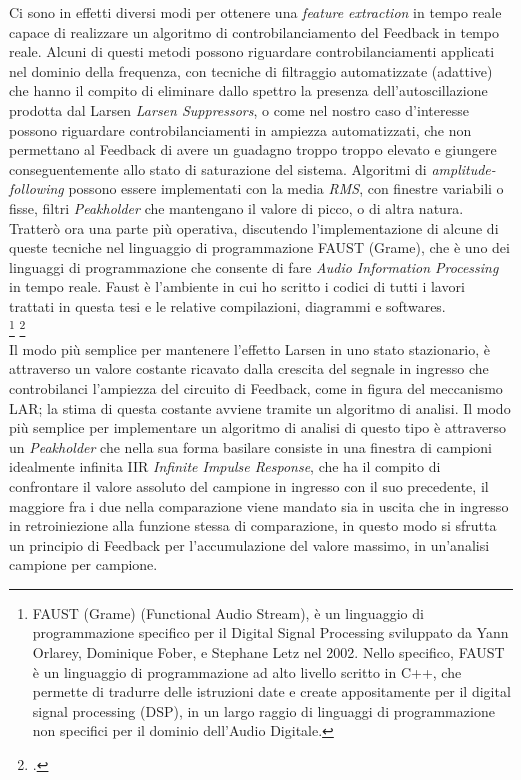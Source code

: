 Ci sono in effetti diversi modi per ottenere una \textit{feature extraction} 
in tempo reale capace di realizzare un algoritmo di controbilanciamento 
del Feedback in tempo reale.
Alcuni di questi metodi possono riguardare controbilanciamenti 
applicati nel dominio della frequenza,
con tecniche di filtraggio automatizzate (adattive) che
hanno il compito di eliminare dallo spettro la presenza dell'autoscillazione prodotta dal Larsen \textit{Larsen Suppressors},
o come nel nostro caso d’interesse possono riguardare controbilanciamenti in ampiezza
automatizzati, che non permettano al Feedback di avere un guadagno troppo troppo elevato 
e giungere conseguentemente allo stato di saturazione del sistema.
Algoritmi di \textit{amplitude-following} possono essere implementati 
con la media \textit{RMS}, con finestre variabili o fisse, 
filtri \textit{Peakholder} che mantengano il valore di picco, o di altra natura. \\
Tratterò ora  una parte più operativa, discutendo l'implementazione
di alcune di queste tecniche nel linguaggio di programmazione FAUST (Grame), 
che è uno dei linguaggi di programmazione
che consente di fare \textit{Audio Information Processing} in tempo reale.
Faust è l'ambiente in cui ho scritto i codici di tutti i lavori trattati
in questa tesi e le relative compilazioni, diagrammi e softwares. \\
\footnote{FAUST (Grame) (Functional Audio Stream), 
è un linguaggio di programmazione specifico per il Digital Signal
Processing sviluppato da Yann Orlarey, Dominique Fober, e Stephane Letz nel
2002. Nello specifico, FAUST è un linguaggio di programmazione ad alto livello
scritto in C++, che permette di tradurre delle istruzioni date e create 
appositamente per il digital signal processing (DSP), in un largo raggio di linguaggi
di programmazione non specifici per il dominio dell’Audio Digitale.} \footcite{https://faust.grame.fr/} \\
Il modo più semplice per mantenere l’effetto Larsen in uno stato stazionario, è attraverso un
valore costante ricavato dalla crescita del segnale in ingresso 
che controbilanci l’ampiezza del circuito di Feedback, come in figura del meccanismo LAR;
la stima di questa costante avviene tramite un algoritmo di analisi.
Il modo più semplice per implementare un algoritmo di analisi di questo tipo
è attraverso un \textit{Peakholder} che nella sua forma basilare consiste in una finestra 
di campioni idealmente infinita IIR \textit{Infinite Impulse Response},
che ha il compito di confrontare il valore assoluto del campione in ingresso con il suo precedente,
il maggiore fra i due nella comparazione viene mandato sia in uscita che in ingresso 
in retroiniezione alla funzione stessa di comparazione, 
in questo modo si sfrutta un principio di Feedback per l'accumulazione
del valore massimo, in un'analisi campione per campione.
\clearpage 

